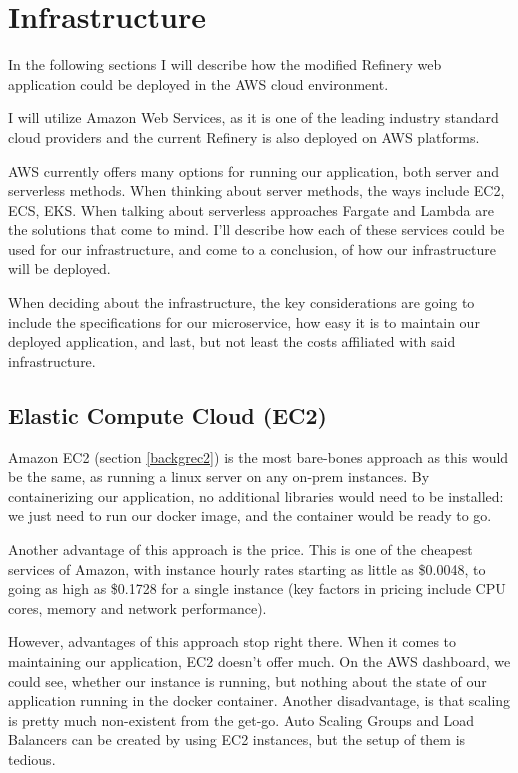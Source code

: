\section{Infrastructure}
	In the following sections I will describe how the modified Refinery web application could be deployed in the AWS cloud environment.

	I will utilize Amazon Web Services, as it is one of the leading industry standard cloud providers
	and the current Refinery is also deployed on AWS platforms.

	AWS currently offers many options for running our application, both server and serverless methods.
	When thinking about server methods, the ways include EC2, ECS, EKS. When talking about serverless approaches
	Fargate and Lambda are the solutions that come to mind. I'll describe how each of these
	services could be used for our infrastructure, and come to a conclusion, of how our infrastructure will be deployed.

	When deciding about the infrastructure, the key considerations are going to include the specifications for our microservice,
	how easy it is to maintain our deployed application, and last, but not least the costs affiliated with said infrastructure.


	\subsection{Elastic Compute Cloud (EC2)}
		Amazon EC2 (section \ref{backgrec2}) is the most bare-bones approach as this
		would be the same, as running a linux server on any on-prem instances. 
		By containerizing our application, no additional libraries
		would need to be installed: we just need to run our docker image, and the container would be ready to go. 
		
		Another advantage of this approach
		is the price. This is one of the cheapest services of Amazon, with instance hourly rates starting as little as \$0.0048, to going as high as 
		\$0.1728 for a single instance (key factors in pricing include CPU cores, memory and network performance).

		However, advantages of this approach stop right there. When it comes to maintaining our application, EC2 doesn't offer much.
		On the AWS dashboard, we could see, whether our instance is running, but nothing about the state of our application running in 
		the docker container. Another disadvantage, is that scaling is pretty much non-existent from the get-go. Auto Scaling Groups and Load Balancers
		can be created by using EC2 instances, but the setup of them is tedious. 

